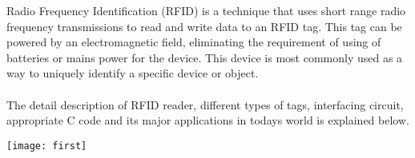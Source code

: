 \documentclass[a4paper,29.6pt]{article}
\begin{document}
\begin{large}
\hspace{.5in}Radio Frequency Identification (RFID) is a technique that uses short range radio frequency transmissions to read and write data to an RFID tag. This tag can be powered by an electromagnetic field, eliminating the requirement of using of batteries or mains power for the device. This device is most commonly used as a way to uniquely identify a specific device or object.
\\\\
The detail description of RFID reader, different types of tags, interfacing circuit, appropriate C code and its major applications in todays world is explained below.\\

\end{large}
\begin{center}
\texttt{[image: first]}
\end{center}


\newpage
\end{document}

